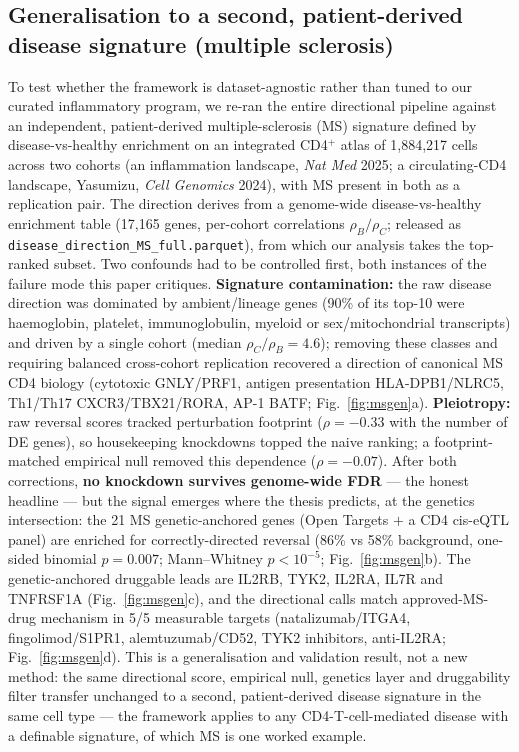 \documentclass[10pt,twocolumn]{article}
\begin{document}
\subsection{Generalisation to a second, patient-derived disease signature (multiple sclerosis)}
To test whether the framework is dataset-agnostic rather than tuned to our curated inflammatory program, we re-ran the entire directional pipeline against an independent, patient-derived multiple-sclerosis (MS) signature defined by disease-vs-healthy enrichment on an integrated CD4$^+$ atlas of 1{,}884{,}217 cells across two cohorts (an inflammation landscape, \emph{Nat Med} 2025; a circulating-CD4 landscape, Yasumizu, \emph{Cell Genomics} 2024), with MS present in both as a replication pair. The direction derives from a genome-wide disease-vs-healthy enrichment table (17{,}165 genes, per-cohort correlations $\rho_B/\rho_C$; released as \texttt{disease\_direction\_MS\_full.parquet}), from which our analysis takes the top-ranked subset. Two confounds had to be controlled first, both instances of the failure mode this paper critiques. \textbf{Signature contamination:} the raw disease direction was dominated by ambient/lineage genes (90\% of its top-10 were haemoglobin, platelet, immunoglobulin, myeloid or sex/mitochondrial transcripts) and driven by a single cohort (median $\rho_C/\rho_B=4.6$); removing these classes and requiring balanced cross-cohort replication recovered a direction of canonical MS CD4 biology (cytotoxic GNLY/PRF1, antigen presentation HLA-DPB1/NLRC5, Th1/Th17 CXCR3/TBX21/RORA, AP-1 BATF; Fig.~\ref{fig:msgen}a). \textbf{Pleiotropy:} raw reversal scores tracked perturbation footprint ($\rho=-0.33$ with the number of DE genes), so housekeeping knockdowns topped the naive ranking; a footprint-matched empirical null removed this dependence ($\rho=-0.07$). After both corrections, \textbf{no knockdown survives genome-wide FDR} --- the honest headline --- but the signal emerges where the thesis predicts, at the genetics intersection: the 21 MS genetic-anchored genes (Open Targets $+$ a CD4 cis-eQTL panel) are enriched for correctly-directed reversal (86\% vs 58\% background, one-sided binomial $p=0.007$; Mann--Whitney $p<10^{-5}$; Fig.~\ref{fig:msgen}b). The genetic-anchored druggable leads are IL2RB, TYK2, IL2RA, IL7R and TNFRSF1A (Fig.~\ref{fig:msgen}c), and the directional calls match approved-MS-drug mechanism in 5/5 measurable targets (natalizumab/ITGA4, fingolimod/S1PR1, alemtuzumab/CD52, TYK2 inhibitors, anti-IL2RA; Fig.~\ref{fig:msgen}d). This is a generalisation and validation result, not a new method: the same directional score, empirical null, genetics layer and druggability filter transfer unchanged to a second, patient-derived disease signature in the same cell type --- the framework applies to any CD4-T-cell-mediated disease with a definable signature, of which MS is one worked example.
\end{document}
